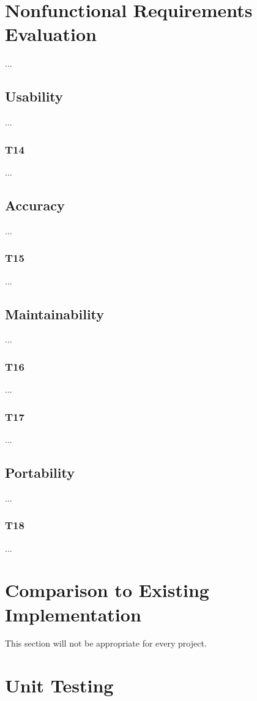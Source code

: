 \documentclass[12pt, titlepage]{article}
\begin{document}
\newpage
\clearpage

\section{Nonfunctional Requirements Evaluation}
...

\subsection{Usability}
...
\subsubsection{T14}
...

\subsection{Accuracy}
...
\subsubsection{T15}
...

\subsection{Maintainability}
...
\subsubsection{T16}
...
\subsubsection{T17}
...

\subsection{Portability}
...
\subsubsection{T18}
...
	
\section{Comparison to Existing Implementation}	

This section will not be appropriate for every project.

\section{Unit Testing}
\end{document}
